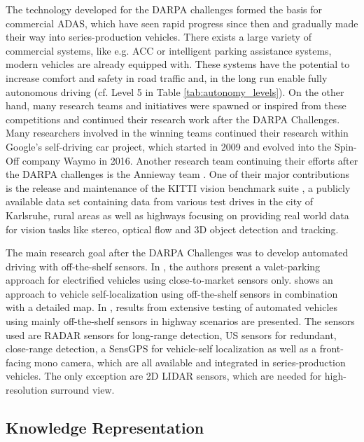 The technology developed for the \ac{DARPA} challenges formed the basis for commercial \ac{ADAS}, which have seen rapid progress since then and gradually made their way into series-production vehicles.
There exists a large variety of commercial systems, like e.g. \ac{ACC} or intelligent parking assistance systems, modern vehicles are already equipped with.
These systems have the potential to increase comfort and safety in road traffic and, in the long run enable fully autonomous driving (cf. Level \num{5}  in Table \ref{tab:autonomy_levels}).
On the other hand, many research teams and initiatives were spawned or inspired from these competitions and continued their research work after the \ac{DARPA} Challenges.
Many researchers involved in the winning teams continued their research within Google's self-driving car project, which started in 2009 and evolved into the Spin-Off company Waymo \cite{Waymo} in 2016.
Another research team continuing their efforts after the \ac{DARPA} challenges is the Annieway team \cite{Annieway}.
One of their major contributions is the release and maintenance of the KITTI vision benchmark suite \cite{Geiger2013a}, a publicly available data set containing data from various test drives in the city of Karlsruhe, rural areas as well as highways focusing on providing real world data for vision tasks like stereo, optical flow and 3D object detection and tracking.

The main research goal after the \ac{DARPA} Challenges was to develop automated driving with off-the-shelf sensors.
In \cite{Furgale2013}, the authors present a valet-parking approach for electrified vehicles using close-to-market sensors only.
\cite{Lundgren2014} shows an approach to vehicle self-localization using off-the-shelf sensors in combination with a detailed map.
In \cite{Aeberhard2015}, results from extensive testing of automated vehicles using mainly off-the-shelf sensors in highway scenarios are presented.
The sensors used are \ac{RADAR} sensors for long-range detection, \acf{US} sensors for redundant, close-range detection, a \ac{SensGPS} for vehicle-self localization as well as a front-facing mono camera, which are all available and integrated in series-production vehicles.
The only exception are 2D \ac{LIDAR} sensors, which are needed for high-resolution surround view.

\subsection{Knowledge Representation}
\label{subsec:knowledge_representation}

